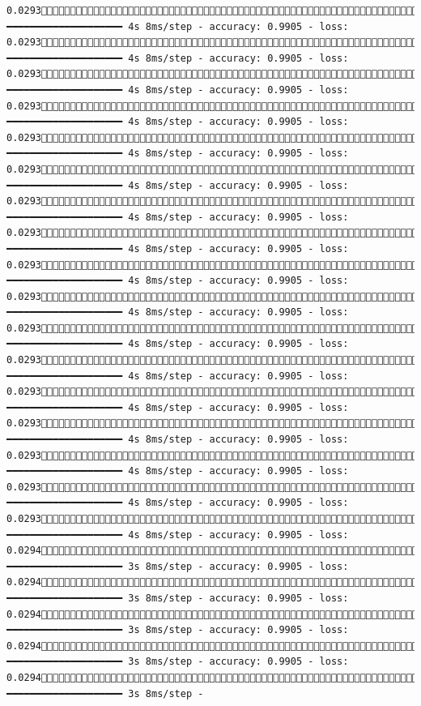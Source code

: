 \documentclass[
  letterpaper,
  DIV=11,
  numbers=noendperiod]{scrreprt}
\begin{document}
\begin{verbatim}
0.02931238/1875 ━━━━━━━━━━━━━━━━━━━━ 4s 8ms/step - accuracy: 0.9905 - loss: 0.02931244/1875 ━━━━━━━━━━━━━━━━━━━━ 4s 8ms/step - accuracy: 0.9905 - loss: 0.02931250/1875 ━━━━━━━━━━━━━━━━━━━━ 4s 8ms/step - accuracy: 0.9905 - loss: 0.02931257/1875 ━━━━━━━━━━━━━━━━━━━━ 4s 8ms/step - accuracy: 0.9905 - loss: 0.02931265/1875 ━━━━━━━━━━━━━━━━━━━━ 4s 8ms/step - accuracy: 0.9905 - loss: 0.02931272/1875 ━━━━━━━━━━━━━━━━━━━━ 4s 8ms/step - accuracy: 0.9905 - loss: 0.02931280/1875 ━━━━━━━━━━━━━━━━━━━━ 4s 8ms/step - accuracy: 0.9905 - loss: 0.02931286/1875 ━━━━━━━━━━━━━━━━━━━━ 4s 8ms/step - accuracy: 0.9905 - loss: 0.02931293/1875 ━━━━━━━━━━━━━━━━━━━━ 4s 8ms/step - accuracy: 0.9905 - loss: 0.02931300/1875 ━━━━━━━━━━━━━━━━━━━━ 4s 8ms/step - accuracy: 0.9905 - loss: 0.02931307/1875 ━━━━━━━━━━━━━━━━━━━━ 4s 8ms/step - accuracy: 0.9905 - loss: 0.02931314/1875 ━━━━━━━━━━━━━━━━━━━━ 4s 8ms/step - accuracy: 0.9905 - loss: 0.02931320/1875 ━━━━━━━━━━━━━━━━━━━━ 4s 8ms/step - accuracy: 0.9905 - loss: 0.02931326/1875 ━━━━━━━━━━━━━━━━━━━━ 4s 8ms/step - accuracy: 0.9905 - loss: 0.02931332/1875 ━━━━━━━━━━━━━━━━━━━━ 4s 8ms/step - accuracy: 0.9905 - loss: 0.02931338/1875 ━━━━━━━━━━━━━━━━━━━━ 4s 8ms/step - accuracy: 0.9905 - loss: 0.02931345/1875 ━━━━━━━━━━━━━━━━━━━━ 4s 8ms/step - accuracy: 0.9905 - loss: 0.02941352/1875 ━━━━━━━━━━━━━━━━━━━━ 3s 8ms/step - accuracy: 0.9905 - loss: 0.02941359/1875 ━━━━━━━━━━━━━━━━━━━━ 3s 8ms/step - accuracy: 0.9905 - loss: 0.02941365/1875 ━━━━━━━━━━━━━━━━━━━━ 3s 8ms/step - accuracy: 0.9905 - loss: 0.02941372/1875 ━━━━━━━━━━━━━━━━━━━━ 3s 8ms/step - accuracy: 0.9905 - loss: 0.02941379/1875 ━━━━━━━━━━━━━━━━━━━━ 3s 8ms/step - 
\end{verbatim}
\end{document}
